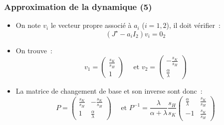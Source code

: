 \documentclass[10pt,notheorems]{beamer}
\theoremstyle{plain}
\theoremstyle{definition} %
\begin{document}
\begin{frame}
  \frametitle{Approximation de la dynamique (5)}

  \begin{itemize}

  \item On note $v_i$ le vecteur propre associé à $a_i$ ($i=1,2$), il doit vérifier~:
    \[
      (J^\star-a_i I_2)v_i = 0_2
    \]

  \item On trouve~:
    \[
      v_1 =
      \begin{pmatrix}
        \frac{s_K}{s_H}\\
        1
      \end{pmatrix}
      \quad
      \text{ et }
      v_2 =
      \begin{pmatrix}
        -\frac{s_K}{s_H}\\
        \frac{\alpha}{\lambda}
      \end{pmatrix}
    \]

    \medskip

  \item La matrice de changement de base et son inverse sont donc~:
    \[
      P =
      \begin{pmatrix}
        \frac{s_K}{s_H} & -\frac{s_K}{s_H}\\
        1 & \frac{\alpha}{\lambda}
      \end{pmatrix}
      \quad
      \text{ et }
      P^{-1} =
      \frac{\lambda}{\alpha+\lambda}\frac{s_H}{s_K}
      \begin{pmatrix}
        \frac{\alpha}{\lambda} & \frac{s_K}{s_H}\\
        -1 & \frac{s_K}{s_H}
      \end{pmatrix}
    \]

  \end{itemize}
\end{frame}
\end{document}
